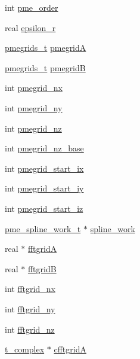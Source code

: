 \begin{DoxyCompactItemize}
\item 
int \hyperlink{structgmx__pme_a36d995358380d4b0ff3900bbf5711602}{pme\-\_\-order}
\item 
real \hyperlink{structgmx__pme_ad10ed6ad7bdff1bcf76142e1b4126af4}{epsilon\-\_\-r}
\item 
\hyperlink{structpmegrids__t}{pmegrids\-\_\-t} \hyperlink{structgmx__pme_a47c969248b236c0cd5eb24b3a83013d3}{pmegrid\-A}
\item 
\hyperlink{structpmegrids__t}{pmegrids\-\_\-t} \hyperlink{structgmx__pme_acb5c7419d66b40d991c6b16b682a79cc}{pmegrid\-B}
\item 
int \hyperlink{structgmx__pme_a0a98078305b257d146404dcee6eb2853}{pmegrid\-\_\-nx}
\item 
int \hyperlink{structgmx__pme_a1eb604600a261e6b91decf2f7376b1d3}{pmegrid\-\_\-ny}
\item 
int \hyperlink{structgmx__pme_ad330725ac24b605d58552a860cdf7e26}{pmegrid\-\_\-nz}
\item 
int \hyperlink{structgmx__pme_a93d54c086a2fdda4b0b1565f3cfee6b6}{pmegrid\-\_\-nz\-\_\-base}
\item 
int \hyperlink{structgmx__pme_a294acee1584096bf5177c69e156482a5}{pmegrid\-\_\-start\-\_\-ix}
\item 
int \hyperlink{structgmx__pme_acc27bd15255e71d66b49c55a75aa5a1b}{pmegrid\-\_\-start\-\_\-iy}
\item 
int \hyperlink{structgmx__pme_a009139609ed597f656fd398e2e82ae55}{pmegrid\-\_\-start\-\_\-iz}
\item 
\hyperlink{structpme__spline__work__t}{pme\-\_\-spline\-\_\-work\-\_\-t} $\ast$ \hyperlink{structgmx__pme_a80909d6a1bf206d75f054065e39afbb4}{spline\-\_\-work}
\item 
real $\ast$ \hyperlink{structgmx__pme_a9a595560f51af40f76cc0c27f72388e5}{fftgrid\-A}
\item 
real $\ast$ \hyperlink{structgmx__pme_a542329555c2df3d4e57b99542255bd2e}{fftgrid\-B}
\item 
int \hyperlink{structgmx__pme_a4974ca324c0048f75e91acf6c4724e83}{fftgrid\-\_\-nx}
\item 
int \hyperlink{structgmx__pme_afa8c092ed1153304797b00c7282ef2ec}{fftgrid\-\_\-ny}
\item 
int \hyperlink{structgmx__pme_ab19a54c1cbe6ef2b45e7ce0f78ab2b87}{fftgrid\-\_\-nz}
\item 
\hyperlink{structt__complex}{t\-\_\-complex} $\ast$ \hyperlink{structgmx__pme_aacbb3bc33e1bb1130e915b2b163879ff}{cfftgrid\-A}
\item 

\end{DoxyCompactItemize}

